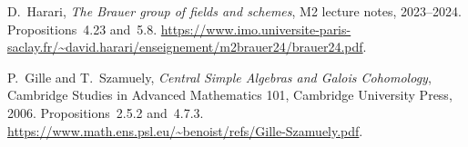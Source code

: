 D.~Harari, \emph{The Brauer group of fields and schemes}, M2 lecture notes, 2023--2024.
Propositions~4.23 and~5.8.
\url{https://www.imo.universite-paris-saclay.fr/~david.harari/enseignement/m2brauer24/brauer24.pdf}.

P.~Gille and T.~Szamuely, \emph{Central Simple Algebras and Galois Cohomology},
Cambridge Studies in Advanced Mathematics 101, Cambridge University Press, 2006.
Propositions~2.5.2 and~4.7.3.
\url{https://www.math.ens.psl.eu/~benoist/refs/Gille-Szamuely.pdf}.
